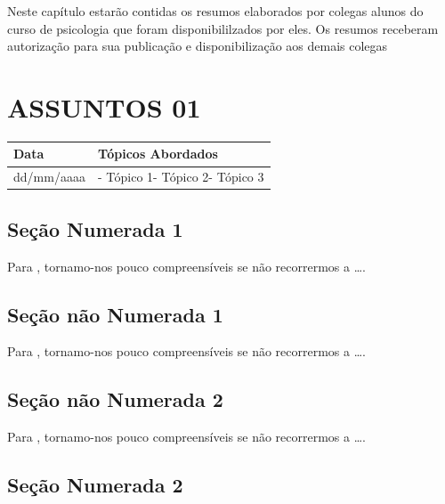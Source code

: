 \documentclass[
]{book}
\begin{document}
Neste capítulo estarão contidas os resumos elaborados por colegas alunos do curso de psicologia que foram disponibililzados por eles. Os resumos receberam autorização para sua publicação e disponibilização aos demais colegas

\hypertarget{assuntos-01-1}{%
\section{ASSUNTOS 01}\label{assuntos-01-1}}

\begin{longtable}[]{@{}ll@{}}
\toprule()
Data & Tópicos Abordados \\
\midrule()
\endhead
dd/mm/aaaa & - Tópico 1- Tópico 2- Tópico 3 \\
\bottomrule()
\end{longtable}

\hypertarget{seuxe7uxe3o-numerada-1-19}{%
\subsection{Seção Numerada 1}\label{seuxe7uxe3o-numerada-1-19}}

Para \citet{BOCK2001}, tornamo-nos pouco compreensíveis se não recorrermos a \ldots.

\hypertarget{seuxe7uxe3o-nuxe3o-numerada-1-38}{%
\subsection*{Seção não Numerada 1}\label{seuxe7uxe3o-nuxe3o-numerada-1-38}}

Para \citet{BOCK2001}, tornamo-nos pouco compreensíveis se não recorrermos a \ldots.

\hypertarget{seuxe7uxe3o-nuxe3o-numerada-2-57}{%
\subsection*{Seção não Numerada 2}\label{seuxe7uxe3o-nuxe3o-numerada-2-57}}

Para \citet{BOCK2001}, tornamo-nos pouco compreensíveis se não recorrermos a \ldots.

\hypertarget{seuxe7uxe3o-numerada-2-19}{%
\subsection{Seção Numerada 2}\label{seuxe7uxe3o-numerada-2-19}}
\end{document}
